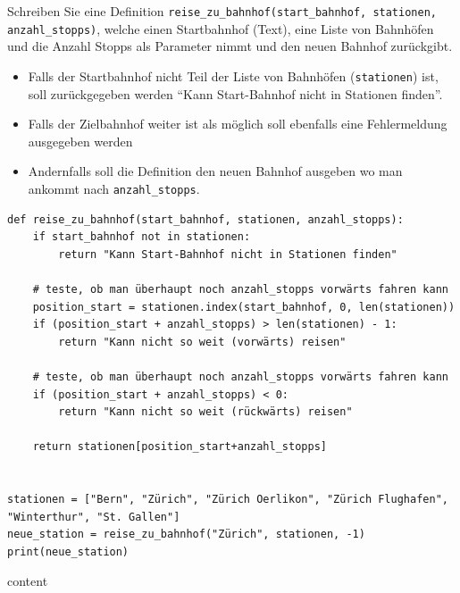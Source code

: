 \begin{questions}
Schreiben Sie eine Definition \lstinline|reise_zu_bahnhof(start_bahnhof, stationen, anzahl_stopps)|, welche einen Startbahnhof (Text), eine Liste von Bahnhöfen und die Anzahl Stopps als Parameter nimmt und den neuen Bahnhof zurückgibt.
\begin{itemize}
\item Falls der Startbahnhof nicht Teil der Liste von Bahnhöfen (\lstinline|stationen|) ist, soll zurückgegeben werden \enquote{Kann Start-Bahnhof nicht in Stationen finden}.
\item Falls der Zielbahnhof weiter ist als möglich soll ebenfalls eine Fehlermeldung ausgegeben werden
\item Andernfalls soll die Definition den neuen Bahnhof ausgeben wo man ankommt nach \lstinline|anzahl_stopps|.
\end{itemize}
\begin{solution}
\begin{lstlisting}
def reise_zu_bahnhof(start_bahnhof, stationen, anzahl_stopps):
    if start_bahnhof not in stationen:
        return "Kann Start-Bahnhof nicht in Stationen finden"
    
    # teste, ob man überhaupt noch anzahl_stopps vorwärts fahren kann
    position_start = stationen.index(start_bahnhof, 0, len(stationen))
    if (position_start + anzahl_stopps) > len(stationen) - 1:
        return "Kann nicht so weit (vorwärts) reisen"

    # teste, ob man überhaupt noch anzahl_stopps vorwärts fahren kann
    if (position_start + anzahl_stopps) < 0:
        return "Kann nicht so weit (rückwärts) reisen"

    return stationen[position_start+anzahl_stopps]


stationen = ["Bern", "Zürich", "Zürich Oerlikon", "Zürich Flughafen", "Winterthur", "St. Gallen"]
neue_station = reise_zu_bahnhof("Zürich", stationen, -1)
print(neue_station)
\end{lstlisting}
content
\end{solution}

\end{questions}
